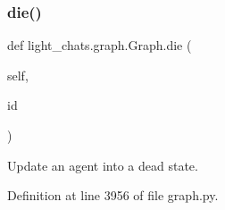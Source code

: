\mbox{\label{classlight__chats_1_1graph_1_1Graph_a74bc5374a9c9f411008e726fac4cd7f1}} 
\subsubsection{\texorpdfstring{die()}{die()}}
{\footnotesize\ttfamily def light\+\_\+chats.\+graph.\+Graph.\+die (\begin{DoxyParamCaption}\item[{}]{self,  }\item[{}]{id }\end{DoxyParamCaption})}

\begin{DoxyVerb}Update an agent into a dead state.
\end{DoxyVerb}
 

Definition at line 3956 of file graph.\+py.


